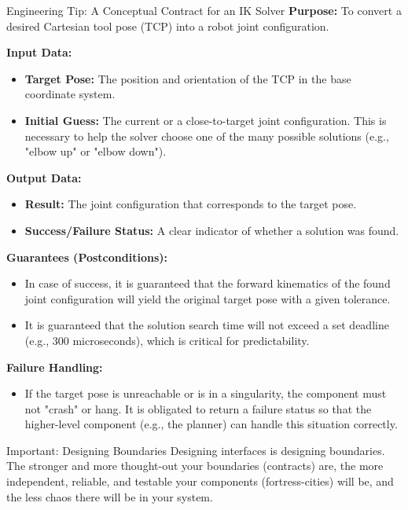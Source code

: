 \begin{tipbox}{Engineering Tip: A Conceptual Contract for an IK Solver}
\textbf{Purpose:} To convert a desired Cartesian tool pose (TCP) into a robot joint configuration.

\textbf{Input Data:}
\begin{itemize}
    \item \textbf{Target Pose:} The position and orientation of the TCP in the base coordinate system.
    \item \textbf{Initial Guess:} The current or a close-to-target joint configuration. This is necessary to help the solver choose one of the many possible solutions (e.g., "elbow up" or "elbow down").
\end{itemize}

\textbf{Output Data:}
\begin{itemize}
    \item \textbf{Result:} The joint configuration that corresponds to the target pose.
    \item \textbf{Success/Failure Status:} A clear indicator of whether a solution was found.
\end{itemize}

\textbf{Guarantees (Postconditions):}
\begin{itemize}
    \item In case of success, it is guaranteed that the forward kinematics of the found joint configuration will yield the original target pose with a given tolerance.
    \item It is guaranteed that the solution search time will not exceed a set deadline (e.g., 300 microseconds), which is critical for predictability.
\end{itemize}

\textbf{Failure Handling:}
\begin{itemize}
    \item If the target pose is unreachable or is in a singularity, the component must not "crash" or hang. It is obligated to return a failure status so that the higher-level component (e.g., the planner) can handle this situation correctly.
\end{itemize}
\end{tipbox}

\begin{principlebox}{Important: Designing Boundaries}
Designing interfaces is designing boundaries. The stronger and more thought-out your boundaries (contracts) are, the more independent, reliable, and testable your components (fortress-cities) will be, and the less chaos there will be in your system.
\end{principlebox}

